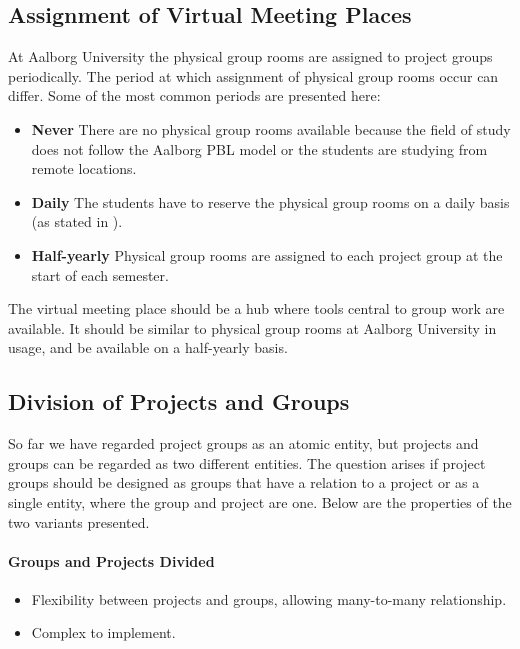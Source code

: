 \subsection{Assignment of Virtual Meeting Places}
At Aalborg University the physical group rooms are assigned to project groups periodically.
The period at which assignment of physical group rooms occur can differ.
Some of the most common periods are presented here:
\begin{itemize}
	\item \textbf{Never} There are no physical group rooms available because the field of study does not follow the Aalborg PBL model or the students are studying from remote locations.
	\item \textbf{Daily} The students have to reserve the physical group rooms on a daily basis (as stated in ).
	\item \textbf{Half-yearly} Physical group rooms are assigned to each project group at the start of each semester.
\end{itemize} 

The virtual meeting place should be a hub where tools central to group work are available.
It should be similar to physical group rooms at Aalborg University in usage, and be available on a half-yearly basis.


\subsection{Division of Projects and Groups}
\label{sub:divProjGroup}
So far we have regarded project groups as an atomic entity, but projects and groups can be regarded as two different entities.
The question arises if project groups should be designed as groups that have a relation to a project or as a single entity, where the group and project are one.
Below are the properties of the two variants presented.


\paragraph{Groups and Projects Divided} 
\begin{itemize}
	\item Flexibility between projects and groups, allowing many-to-many relationship.
	\item Complex to implement.
\end{itemize}


